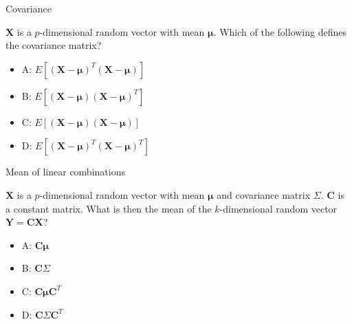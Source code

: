 \documentclass[ignorenonframetext,]{beamer}
\providecommand{\tightlist}{%
  \setlength{\itemsep}{0pt}\setlength{\parskip}{0pt}}
\begin{document}
\begin{frame}

\begin{block}{Covariance}

\(\mathbf{X}\) is a \(p\)-dimensional random vector with mean
\(\mathbf{\mu}\). Which of the following defines the covariance matrix?

\begin{itemize}
\tightlist
\item
  A: \(E[(\mathbf{X}-\mathbf{\mu})^T(\mathbf{X}-\mathbf{\mu})]\)
\item
  B: \(E[(\mathbf{X}-\mathbf{\mu})(\mathbf{X}-\mathbf{\mu})^T]\)
\item
  C: \(E[(\mathbf{X}-\mathbf{\mu})(\mathbf{X}-\mathbf{\mu})]\)\\
\item
  D: \(E[(\mathbf{X}-\mathbf{\mu})^T(\mathbf{X}-\mathbf{\mu})^T]\)
\end{itemize}

\end{block}

\end{frame}

\begin{frame}

\begin{block}{Mean of linear combinations}

\(\mathbf{X}\) is a \(p\)-dimensional random vector with mean
\(\mathbf{\mu}\) and covariance matrix \(\Sigma\). \(\mathbf{C}\) is a
constant matrix. What is then the mean of the \(k\)-dimensional random
vector \(\mathbf{Y}=\mathbf{C}\mathbf{X}\)?

\begin{itemize}
\tightlist
\item
  A: \(\mathbf{C}\mathbf{\mu}\)
\item
  B: \(\mathbf{C}\Sigma\)
\item
  C: \(\mathbf{C}\mathbf{\mu}\mathbf{C}^T\)
\item
  D: \(\mathbf{C}\Sigma\mathbf{C}^T\)
\end{itemize}

\end{block}

\end{frame}
\end{document}
